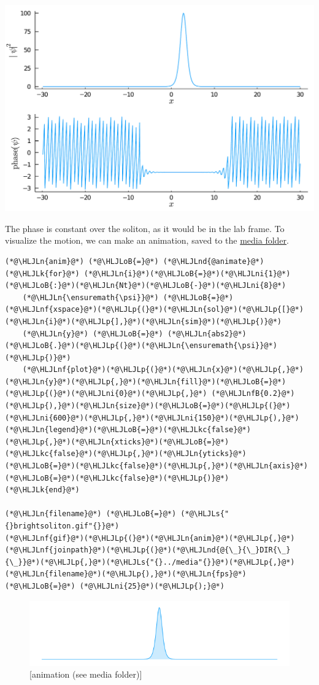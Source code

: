 \documentclass[12pt,a4paper]{article}
\newcommand{\HLJLk}[1]{\textcolor[RGB]{148,91,176}{\textbf{#1}}}
\newcommand{\HLJLkc}[1]{\textcolor[RGB]{59,151,46}{\textit{#1}}}
\newcommand{\HLJLn}[1]{#1}
\newcommand{\HLJLnd}[1]{\textcolor[RGB]{214,102,97}{#1}}
\newcommand{\HLJLnf}[1]{\textcolor[RGB]{66,102,213}{#1}}
\newcommand{\HLJLs}[1]{\textcolor[RGB]{201,61,57}{#1}}
\newcommand{\HLJLnfB}[1]{\textcolor[RGB]{59,151,46}{#1}}
\newcommand{\HLJLni}[1]{\textcolor[RGB]{59,151,46}{#1}}
\newcommand{\HLJLoB}[1]{\textcolor[RGB]{102,102,102}{\textbf{#1}}}
\newcommand{\HLJLp}[1]{#1}
\begin{document}
\includegraphics[width=\linewidth]{jl_EXlQxb/1dbrightsoliton_7_1.pdf}

The phase is constant over the soliton, as it would be in the lab frame.  To visualize the motion, we can make an animation, saved to the \href{../../media/brightsoliton.gif}{media folder}.


\begin{lstlisting}
(*@\HLJLn{anim}@*) (*@\HLJLoB{=}@*) (*@\HLJLnd{@animate}@*) (*@\HLJLk{for}@*) (*@\HLJLn{i}@*)(*@\HLJLoB{=}@*)(*@\HLJLni{1}@*)(*@\HLJLoB{:}@*)(*@\HLJLn{Nt}@*)(*@\HLJLoB{-}@*)(*@\HLJLni{8}@*)
    (*@\HLJLn{\ensuremath{\psi}}@*) (*@\HLJLoB{=}@*) (*@\HLJLnf{xspace}@*)(*@\HLJLp{(}@*)(*@\HLJLn{sol}@*)(*@\HLJLp{[}@*)(*@\HLJLn{i}@*)(*@\HLJLp{],}@*)(*@\HLJLn{sim}@*)(*@\HLJLp{)}@*)
    (*@\HLJLn{y}@*) (*@\HLJLoB{=}@*) (*@\HLJLn{abs2}@*)(*@\HLJLoB{.}@*)(*@\HLJLp{(}@*)(*@\HLJLn{\ensuremath{\psi}}@*)(*@\HLJLp{)}@*)
    (*@\HLJLnf{plot}@*)(*@\HLJLp{(}@*)(*@\HLJLn{x}@*)(*@\HLJLp{,}@*)(*@\HLJLn{y}@*)(*@\HLJLp{,}@*)(*@\HLJLn{fill}@*)(*@\HLJLoB{=}@*)(*@\HLJLp{(}@*)(*@\HLJLni{0}@*)(*@\HLJLp{,}@*) (*@\HLJLnfB{0.2}@*)(*@\HLJLp{),}@*)(*@\HLJLn{size}@*)(*@\HLJLoB{=}@*)(*@\HLJLp{(}@*)(*@\HLJLni{600}@*)(*@\HLJLp{,}@*)(*@\HLJLni{150}@*)(*@\HLJLp{),}@*)(*@\HLJLn{legend}@*)(*@\HLJLoB{=}@*)(*@\HLJLkc{false}@*)(*@\HLJLp{,}@*)(*@\HLJLn{xticks}@*)(*@\HLJLoB{=}@*)(*@\HLJLkc{false}@*)(*@\HLJLp{,}@*)(*@\HLJLn{yticks}@*)(*@\HLJLoB{=}@*)(*@\HLJLkc{false}@*)(*@\HLJLp{,}@*)(*@\HLJLn{axis}@*)(*@\HLJLoB{=}@*)(*@\HLJLkc{false}@*)(*@\HLJLp{)}@*)
(*@\HLJLk{end}@*)

(*@\HLJLn{filename}@*) (*@\HLJLoB{=}@*) (*@\HLJLs{"{}brightsoliton.gif"{}}@*)
(*@\HLJLnf{gif}@*)(*@\HLJLp{(}@*)(*@\HLJLn{anim}@*)(*@\HLJLp{,}@*)(*@\HLJLnf{joinpath}@*)(*@\HLJLp{(}@*)(*@\HLJLnd{@{\_}{\_}DIR{\_}{\_}}@*)(*@\HLJLp{,}@*)(*@\HLJLs{"{}../media"{}}@*)(*@\HLJLp{,}@*)(*@\HLJLn{filename}@*)(*@\HLJLp{),}@*)(*@\HLJLn{fps}@*) (*@\HLJLoB{=}@*) (*@\HLJLni{25}@*)(*@\HLJLp{);}@*)
\end{lstlisting}


\begin{figure}
\centering
\includegraphics{../../media/brightsoliton.gif}
\caption{[animation (see media folder)]}
\end{figure}
\end{document}
